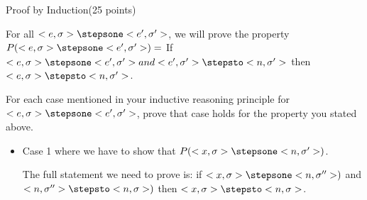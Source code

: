 \documentclass{article}
\begin{document}
\begin{question}{Proof by Induction}{(25 points)}
\begin{subquestion}
  	
  \end{subquestion}

  \begin{subquestion}
    For all $<e,\sigma> \stepsone <e',\sigma'>$, we will prove the property $P(<e,\sigma> \stepsone <e',\sigma'>) =$ If $<e, \sigma> \stepsone <e',\sigma'> and <e', \sigma'> \stepsto <n, \sigma'>$ then $<e, \sigma> \stepsto <n, \sigma'>$.
  \end{subquestion}

  \begin{subquestion}
  	
  	 For each case mentioned in your inductive reasoning principle for $<e, \sigma> \stepsone <e', \sigma'>$, prove that case
  	holds for the property you stated above. 


\begin{itemize}







\item Case 1 where we have to show that $P(<x, \sigma> \stepsone <n, \sigma'>)$.

The full statement we need to prove is: if $<x, \sigma> \stepsone <n, \sigma''>)$ and $<n, \sigma''> \stepsto <n, \sigma>)$ then $<x, \sigma> \stepsto <n, \sigma>$.



\end{itemize}
\end{subquestion}
\end{question}
\end{document}
